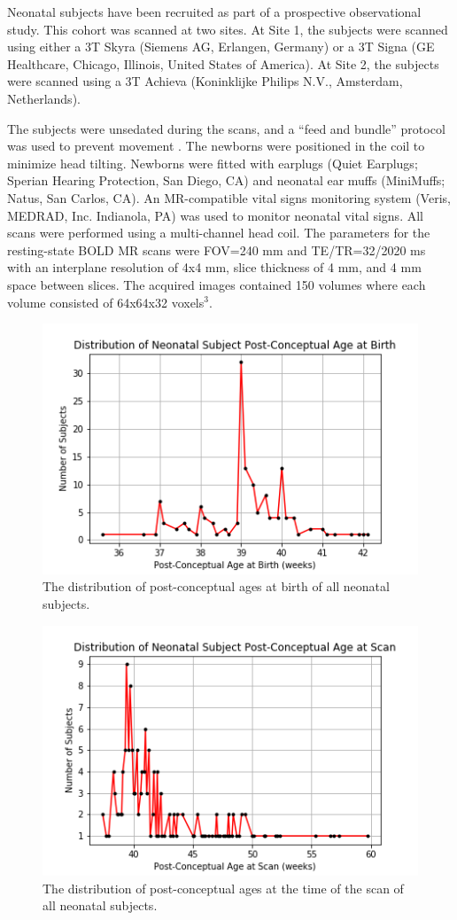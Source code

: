 Neonatal subjects have been recruited as part of a prospective observational study. This cohort was scanned at two sites. At Site 1, the subjects were scanned using either a 3T Skyra (Siemens AG, Erlangen, Germany) or a 3T Signa (GE Healthcare, Chicago, Illinois, United States of America). At Site 2, the subjects were scanned using a 3T Achieva (Koninklijke Philips N.V., Amsterdam, Netherlands).

The subjects were unsedated during the scans, and a ``feed and bundle'' protocol was used to prevent movement \cite{Windram2011}. The newborns were positioned in the coil to minimize head tilting. Newborns were fitted with earplugs (Quiet Earplugs; Sperian Hearing Protection, San Diego, CA) and neonatal ear muffs (MiniMuffs; Natus, San Carlos, CA). An MR-compatible vital signs monitoring system (Veris, MEDRAD, Inc. Indianola, PA) was used to monitor neonatal vital signs. All scans were performed using a multi-channel head coil. The parameters for the resting-state BOLD MR scans were FOV=240 mm and TE/TR=32/2020 ms with an interplane resolution of 4x4 mm, slice thickness of 4 mm, and 4 mm space between slices. The acquired images contained 150 volumes where each volume consisted of 64x64x32 voxels$^3$.

\begin{figure}
\centering
\includegraphics[width=.6\textwidth]{5/demo_neonate_subj_pca.png}
\caption{The distribution of post-conceptual ages at birth of all neonatal subjects.}
\label{ch5:neonates:birthpca}
\end{figure}

\begin{figure}
\centering
\includegraphics[width=.6\textwidth]{5/demo_neonate_scan_pca.png}
\caption{The distribution of post-conceptual ages at the time of the scan of all neonatal subjects.}
\label{ch5:neonates:scanpca}
\end{figure}

